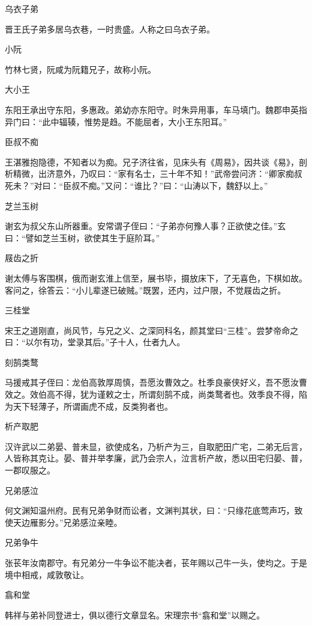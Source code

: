 \documentclass[a4paper,12pt,UTF8,twoside]{ctexbook}
\begin{document}
    乌衣子弟
    
    晋王氏子弟多居乌衣巷，一时贵盛。人称之曰乌衣子弟。
    
    小阮
    
    竹林七贤，阮咸为阮籍兄子，故称小阮。
    
    大小王
    
    东阳王承出守东阳，多惠政。弟幼亦东阳守。时朱异用事，车马填门。魏郡申英指异门曰：“此中辐辏，惟势是趋。不能屈者，大小王东阳耳。”
    
    臣叔不痴
    
    王湛雅抱隐德，不知者以为痴。兄子济往省，见床头有《周易》，因共谈《易》，剖析精微，出济意外，乃叹曰：“家有名士，三十年不知！”武帝尝问济：“卿家痴叔死未？”对曰：“臣叔不痴。”又问：“谁比？”曰：“山涛以下，魏舒以上。”
    
    芝兰玉树
    
    谢玄为叔父东山所器重。安常谓子侄曰：“子弟亦何豫人事？正欲使之佳。”玄曰：“譬如芝兰玉树，欲使其生于庭阶耳。”
    
    屐齿之折
    
    谢太傅与客围棋，俄而谢玄淮上信至，展书毕，摄放床下，了无喜色，下棋如故。客问之，徐答云：“小儿辈遂已破贼。”既罢，还内，过户限，不觉屐齿之折。
    
    三桂堂
    
    宋王之道刚直，尚风节，与兄之义、之深同科名，颜其堂曰“三桂”。尝梦帝命之曰：“以尔有功，堂录其后。”子十人，仕者九人。
    
    刻鹄类鹜
    
    马援戒其子侄曰：龙伯高敦厚周慎，吾愿汝曹效之。杜季良豪侠好义，吾不愿汝曹效之。效伯高不得，犹为谨敕之士，所谓刻鹄不成，尚类鹜者也。效季良不得，陷为天下轻薄子，所谓画虎不成，反类狗者也。
    
    析产取肥
    
    汉许武以二弟晏、普未显，欲使成名，乃析产为三，自取肥田广宅，二弟无后言，人皆称其克让。晏、普并举孝廉，武乃会宗人，泣言析产故，悉以田宅归晏、普，一郡叹服之。
    
    兄弟感泣
    
    何文渊知温州府。民有兄弟争财而讼者，文渊判其状，曰：“只缘花底莺声巧，致使天边雁影分。”兄弟感泣亲睦。
    
    兄弟争牛
    
    张苌年汝南郡守。有兄弟分一牛争讼不能决者，苌年赐以己牛一头，使均之。于是境中相戒，咸敦敬让。
    
    翕和堂
    
    韩祥与弟补同登进士，俱以德行文章显名。宋理宗书“翕和堂”以赐之。
    
\end{document}
